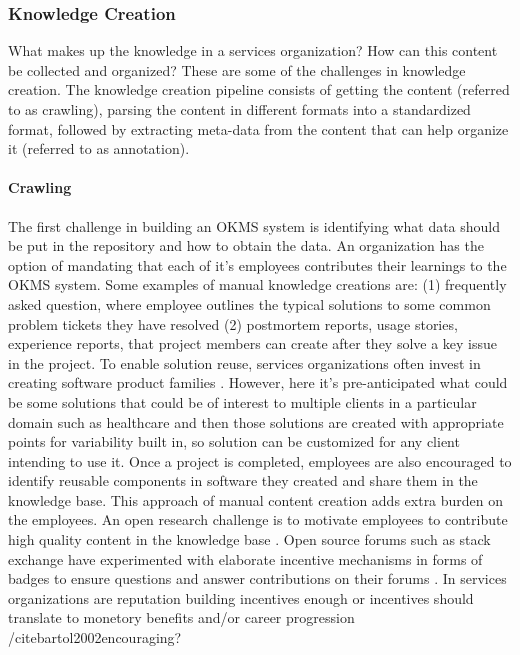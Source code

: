 
\subsubsection{Knowledge Creation}

What makes up the knowledge in a services organization? How can this content be collected and organized? These are some of the challenges in knowledge creation. The knowledge creation pipeline consists of getting the content (referred to as crawling), parsing the content in different formats into a standardized format, followed by extracting meta-data from the content that can help organize it (referred to as annotation). 

\vskip -5pt
\paragraph*{Crawling} The first challenge in building an OKMS system is identifying what data should
be put in the repository and how to obtain the data. An organization has the
option of mandating that each of it's employees contributes their learnings to
the OKMS system. Some examples of manual knowledge creations are: (1) frequently
asked question, where employee outlines the typical solutions to some common
problem tickets they have resolved (2) postmortem reports, usage stories,
experience reports\cite{desouza:2005}, that project members can create after
they solve a key issue in the project. To enable solution reuse, services
organizations often invest in creating software product families
\cite{clements2002software}. However, here it's pre-anticipated what could be
some solutions that could be of interest to multiple clients in a particular
domain such as healthcare and then those solutions are created with appropriate
points for variability built in, so solution can be customized for any client
intending to use it.  Once a project is completed, employees are also encouraged
to identify reusable components in software they created and share them in the
knowledge base. This approach of manual content creation adds extra burden on
the employees. An open research challenge is to motivate employees to contribute
high quality content in the knowledge base \cite{hendriks1999share}. Open source
forums such as stack exchange have experimented with elaborate incentive
mechanisms in forms of badges to ensure questions and answer contributions on
their forums \cite{vasilescu2014social}. In services organizations are
reputation building incentives enough or incentives should translate to monetory
benefits and/or career progression /cite{bartol2002encouraging}?

